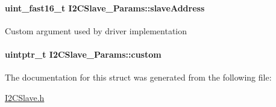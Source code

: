 \paragraph[{slave\+Address}]{\setlength{\rightskip}{0pt plus 5cm}uint\+\_\+fast16\+\_\+t I2\+C\+Slave\+\_\+\+Params\+::slave\+Address}\label{struct_i2_c_slave___params_a9e0bbedf3facf43bb3c56aba78749774}
Custom argument used by driver implementation 
\paragraph[{custom}]{\setlength{\rightskip}{0pt plus 5cm}uintptr\+\_\+t I2\+C\+Slave\+\_\+\+Params\+::custom}\label{struct_i2_c_slave___params_a2e32cd085c51ad9fb6bf32c4d51a69e5}


The documentation for this struct was generated from the following file\+:\begin{DoxyCompactItemize}
\item 
\hyperlink{_i2_c_slave_8h}{I2\+C\+Slave.\+h}\end{DoxyCompactItemize}
